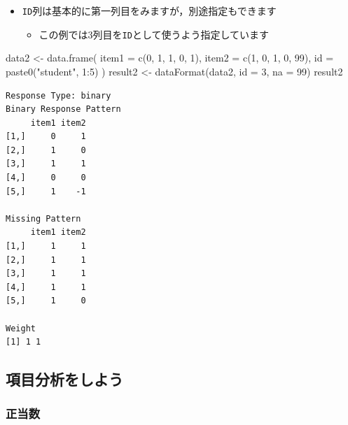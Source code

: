\documentclass[
  a4paper,
]{ltjsbook}
\newenvironment{Shaded}{\begin{snugshade}}{\end{snugshade}}
\newcommand{\AttributeTok}[1]{\textcolor[rgb]{0.40,0.45,0.13}{#1}}
\newcommand{\DecValTok}[1]{\textcolor[rgb]{0.68,0.00,0.00}{#1}}
\newcommand{\FunctionTok}[1]{\textcolor[rgb]{0.28,0.35,0.67}{#1}}
\newcommand{\NormalTok}[1]{\textcolor[rgb]{0.00,0.23,0.31}{#1}}
\newcommand{\OtherTok}[1]{\textcolor[rgb]{0.00,0.23,0.31}{#1}}
\newcommand{\SpecialCharTok}[1]{\textcolor[rgb]{0.37,0.37,0.37}{#1}}
\newcommand{\StringTok}[1]{\textcolor[rgb]{0.13,0.47,0.30}{#1}}
\providecommand{\tightlist}{%
  \setlength{\itemsep}{0pt}\setlength{\parskip}{0pt}}\usepackage{longtable,booktabs,array}
\begin{document}
\begin{itemize}
\tightlist
\item
  \texttt{ID}列は基本的に第一列目をみますが，別途指定もできます

  \begin{itemize}
  \tightlist
  \item
    この例では3列目を\texttt{ID}として使うよう指定しています
  \end{itemize}
\end{itemize}

\begin{Shaded}
\begin{Highlighting}[]
\NormalTok{data2 }\OtherTok{\textless{}{-}} \FunctionTok{data.frame}\NormalTok{(}
    \AttributeTok{item1 =} \FunctionTok{c}\NormalTok{(}\DecValTok{0}\NormalTok{, }\DecValTok{1}\NormalTok{, }\DecValTok{1}\NormalTok{, }\DecValTok{0}\NormalTok{, }\DecValTok{1}\NormalTok{),}
    \AttributeTok{item2 =} \FunctionTok{c}\NormalTok{(}\DecValTok{1}\NormalTok{, }\DecValTok{0}\NormalTok{, }\DecValTok{1}\NormalTok{, }\DecValTok{0}\NormalTok{, }\DecValTok{99}\NormalTok{),}
    \AttributeTok{id =} \FunctionTok{paste0}\NormalTok{(}\StringTok{"student"}\NormalTok{, }\DecValTok{1}\SpecialCharTok{:}\DecValTok{5}\NormalTok{)}
\NormalTok{)}
\NormalTok{result2 }\OtherTok{\textless{}{-}} \FunctionTok{dataFormat}\NormalTok{(data2, }\AttributeTok{id =} \DecValTok{3}\NormalTok{, }\AttributeTok{na =} \DecValTok{99}\NormalTok{)}
\NormalTok{result2}
\end{Highlighting}
\end{Shaded}

\begin{verbatim}
Response Type: binary 
Binary Response Pattern
     item1 item2
[1,]     0     1
[2,]     1     0
[3,]     1     1
[4,]     0     0
[5,]     1    -1

Missing Pattern
     item1 item2
[1,]     1     1
[2,]     1     1
[3,]     1     1
[4,]     1     1
[5,]     1     0

Weight
[1] 1 1
\end{verbatim}

\subsection{項目分析をしよう}\label{ux9805ux76eeux5206ux6790ux3092ux3057ux3088ux3046}

\subsubsection{正当数}\label{ux6b63ux5f53ux6570}
\end{document}

